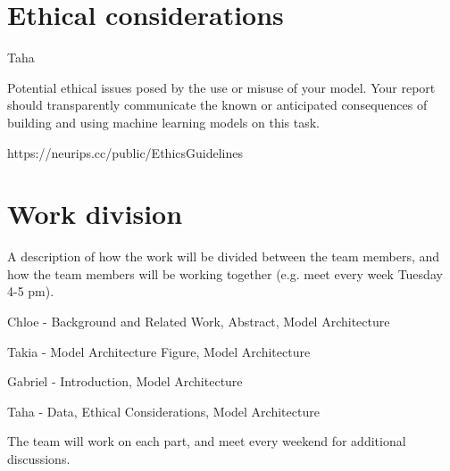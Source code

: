 \documentclass{article}
\begin{document}

\section{Ethical considerations}
Taha

Potential ethical issues posed by the use or misuse of
your model. Your report should transparently
communicate the known or anticipated consequences
of building and using machine learning models on this
task.

https://neurips.cc/public/EthicsGuidelines


\section{Work division}

A description of how the work will be divided between
the team members, and how the team members will be
working together (e.g. meet every week Tuesday 4-5
pm).

Chloe - Background and Related Work, Abstract, Model Architecture

Takia - Model Architecture Figure, Model Architecture

Gabriel - Introduction, Model Architecture

Taha - Data, Ethical Considerations, Model Architecture

The team will work on each part, and meet every weekend for additional discussions. 





\end{document}
